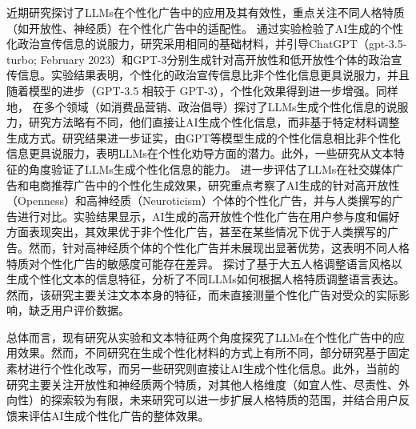 近期研究探讨了LLMs在个性化广告中的应用及其有效性，重点关注不同人格特质（如开放性、神经质）在个性化广告中的适配性。\citet{simchon2024persuasive} 通过实验检验了AI生成的个性化政治宣传信息的说服力，研究采用相同的基础材料，并引导ChatGPT（gpt-3.5-turbo; February 2023）和GPT-3分别生成针对高开放性和低开放性个体的政治宣传信息。实验结果表明，个性化的政治宣传信息比非个性化信息更具说服力，并且随着模型的进步（GPT-3.5 相较于 GPT-3），个性化效果得到进一步增强。同样地，\citet{matz2024potential} 在多个领域（如消费品营销、政治倡导）探讨了LLMs生成个性化信息的说服力，研究方法略有不同，他们直接让AI生成个性化信息，而非基于特定材料调整生成方式。研究结果进一步证实，由GPT等模型生成的个性化信息相比非个性化信息更具说服力，表明LLMs在个性化劝导方面的潜力。此外，一些研究从文本特征的角度验证了LLMs生成个性化信息的能力。\citet{meguellati2024good} 进一步评估了LLMs在社交媒体广告和电商推荐广告中的个性化生成效果，研究重点考察了AI生成的针对高开放性（Openness）和高神经质（Neuroticism）个体的个性化广告，并与人类撰写的广告进行对比。实验结果显示，AI生成的高开放性个性化广告在用户参与度和偏好方面表现突出，其效果优于非个性化广告，甚至在某些情况下优于人类撰写的广告。然而，针对高神经质个体的个性化广告并未展现出显著优势，这表明不同人格特质对个性化广告的敏感度可能存在差异。
\citet{mieleszczenko2024dark} 探讨了基于大五人格调整语言风格以生成个性化文本的信息特征，分析了不同LLMs如何根据人格特质调整语言表达。然而，该研究主要关注文本本身的特征，而未直接测量个性化广告对受众的实际影响，缺乏用户评价数据。

总体而言，现有研究从实验和文本特征两个角度探究了LLMs在个性化广告中的应用效果。然而，不同研究在生成个性化材料的方式上有所不同，部分研究基于固定素材进行个性化改写，而另一些研究则直接让AI生成个性化信息。此外，当前的研究主要关注开放性和神经质两个特质，对其他人格维度（如宜人性、尽责性、外向性）的探索较为有限，未来研究可以进一步扩展人格特质的范围，并结合用户反馈来评估AI生成个性化广告的整体效果。

